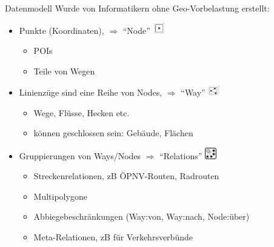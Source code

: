 \documentclass{beamer}
\begin{document}
\begin{frame}{Datenmodell}
Wurde von Informatikern ohne Geo-Vorbelastung erstellt:
\begin{itemize}
  \item Punkte (Koordinaten), $\Rightarrow$ "`Node"' \includegraphics[width=0.5cm]{node.png}
  \begin{itemize}
    \item POIs
    \pause
    \item Teile von Wegen
  \end{itemize}
  \item Linienzüge sind eine Reihe von Nodes, $\Rightarrow$ "`Way"' \includegraphics[width=0.5cm]{way.png}
  \begin{itemize}
    \item Wege, Flüsse, Hecken etc.
    \item können geschlossen sein: Gebäude, Flächen
  \end{itemize}
  \pause
  \item Gruppierungen von Ways/Nodes $\Rightarrow$ "`Relations"' \includegraphics[width=0.5cm]{relation.png}
  \begin{itemize}
    \item Streckenrelationen, zB ÖPNV-Routen, Radrouten
    \item Multipolygone 
    \item Abbiegebeschränkungen (Way:von, Way:nach, Node:über)
    \item Meta-Relationen, zB für Verkehrsverbünde
  \end{itemize}
\end{itemize}

\end{frame}
\end{document}
